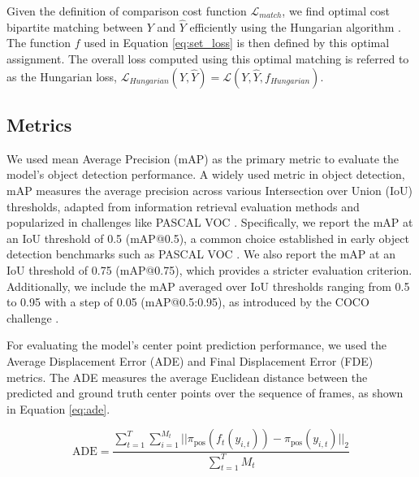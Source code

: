 Given the definition of comparison cost function $\mathcal{L}_{match}$, we find optimal cost bipartite matching between $ Y $ and $ \hat{Y} $ efficiently using the Hungarian algorithm \cite{kuhnHungarianMethodAssignment1955}. The function $f$ used in Equation \ref{eq:set_loss} is then defined by this optimal assignment. The overall loss computed using this optimal matching is referred to as the Hungarian loss, $\mathcal{L}_{Hungarian}(Y, \hat{Y}) = \mathcal{L}(Y, \hat{Y}, f_{Hungarian})$.

\subsection{Metrics} \label{Methods:Metrics}

We used mean Average Precision (mAP) as the primary metric to evaluate the model's object detection performance. A widely used metric in object detection, mAP measures the average precision across various Intersection over Union (IoU) thresholds, adapted from information retrieval evaluation methods and popularized in challenges like PASCAL VOC \cite{everinghamPascalVisualObject2010}. Specifically, we report the mAP at an IoU threshold of 0.5 (mAP@0.5), a common choice established in early object detection benchmarks such as PASCAL VOC \cite{everinghamPascalVisualObject2010}. We also report the mAP at an IoU threshold of 0.75 (mAP@0.75), which provides a stricter evaluation criterion. Additionally, we include the mAP averaged over IoU thresholds ranging from 0.5 to 0.95 with a step of 0.05 (mAP@0.5:0.95), as introduced by the COCO challenge \cite{linMicrosoftCOCOCommon2015a}.

For evaluating the model's center point prediction performance, we used the Average Displacement Error (ADE) and Final Displacement Error (FDE) metrics. The ADE measures the average Euclidean distance between the predicted and ground truth center points over the sequence of frames, as shown in Equation \ref{eq:ade}.

\begin{equation}
    \text{ADE} = \frac{\sum_{t=1}^{T} \sum_{i=1}^{M_t} || \pi_{\text{pos}}(f_t(y_{i,t})) - \pi_{\text{pos}}(y_{i,t}) ||_2}{\sum_{t=1}^{T} M_t}
    \label{eq:ade}
\end{equation}

